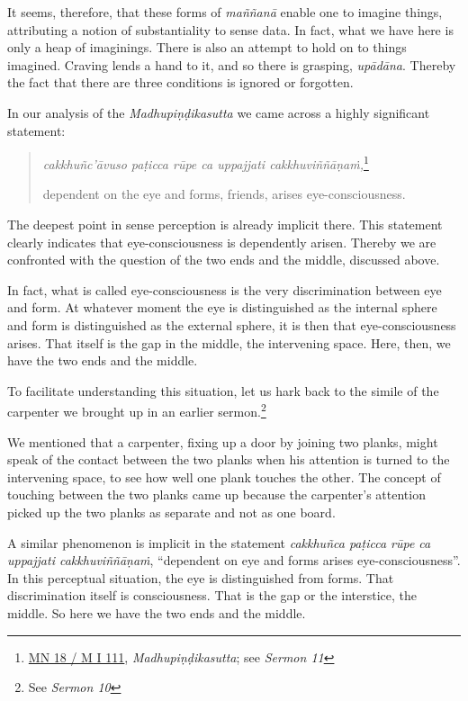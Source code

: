 It seems, therefore, that these forms of \emph{maññanā} enable one to imagine things, attributing a notion of substantiality to sense data. In fact, what we have here is only a heap of imaginings. There is also an attempt to hold on to things imagined. Craving lends a hand to it, and so there is grasping, \emph{upādāna}. Thereby the fact that there are three conditions is ignored or forgotten.

In our analysis of the \emph{Madhupiṇḍikasutta} we came across a highly significant statement:

\begin{quote}
\emph{cakkhuñc'āvuso paṭicca rūpe ca uppajjati cakkhuviññāṇaṁ,}\footnote{\href{https://suttacentral.net/mn18/pli/ms}{MN 18 / M I 111}, \emph{Madhupiṇḍikasutta}; see \emph{Sermon 11}}

dependent on the eye and forms, friends, arises eye-consciousness.
\end{quote}

The deepest point in sense perception is already implicit there. This statement clearly indicates that eye-consciousness is dependently arisen. Thereby we are confronted with the question of the two ends and the middle, discussed above.

In fact, what is called eye-consciousness is the very discrimination between eye and form. At whatever moment the eye is distinguished as the internal sphere and form is distinguished as the external sphere, it is then that eye-consciousness arises. That itself is the gap in the middle, the intervening space. Here, then, we have the two ends and the middle.

To facilitate understanding this situation, let us hark back to the simile of the carpenter we brought up in an earlier sermon.\footnote{See \emph{Sermon 10}}

We mentioned that a carpenter, fixing up a door by joining two planks, might speak of the contact between the two planks when his attention is turned to the intervening space, to see how well one plank touches the other. The concept of touching between the two planks came up because the carpenter's attention picked up the two planks as separate and not as one board.

A similar phenomenon is implicit in the statement \emph{cakkhuñca paṭicca rūpe ca uppajjati cakkhuviññāṇaṁ}, ``dependent on eye and forms arises eye-consciousness''. In this perceptual situation, the eye is distinguished from forms. That discrimination itself is consciousness. That is the gap or the interstice, the middle. So here we have the two ends and the middle.

